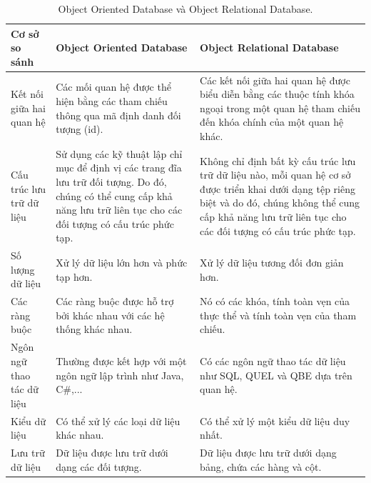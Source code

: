 \begin{table}[h]
    \centering
    \begin{tabular}{|m{3cm}|m{5cm}|m{5cm}|}
    \hline 
        \textbf{Cơ sở so sánh} & \textbf{Object Oriented Database} & \textbf{Object Relational Database}\\ \hline
        Kết nối giữa hai quan hệ 
        & Các mối quan hệ được thể hiện bằng các tham chiếu thông qua mã định danh đối tượng (id).
        & Các kết nối giữa hai quan hệ được biểu diễn bằng các thuộc tính khóa ngoại trong một quan hệ tham chiếu đến khóa chính của một quan hệ khác.\\ \hline
        Cấu trúc lưu trữ dữ liệu 
        & Sử dụng các kỹ thuật lập chỉ mục để định vị các trang đĩa lưu trữ đối tượng. Do đó, chúng có thể cung cấp khả năng lưu trữ liên tục cho các đối tượng có cấu trúc phức tạp. 
        & Không chỉ định bất kỳ cấu trúc lưu trữ dữ liệu nào, mỗi quan hệ cơ sở được triển khai dưới dạng tệp riêng biệt và do đó, chúng không thể cung cấp khả năng lưu trữ liên tục cho các đối tượng có cấu trúc phức tạp.\\ \hline
        Số lượng dữ liệu 
        & Xử lý dữ liệu lớn hơn và phức tạp hơn.
        & Xử lý dữ liệu tương đối đơn giản hơn.\\ \hline
        Các ràng buộc 
        & Các ràng buộc được hỗ trợ bởi khác nhau với các hệ thống khác nhau. 
        & Nó có các khóa, tính toàn vẹn của thực thể và tính toàn vẹn của tham chiếu.\\ \hline
        Ngôn ngữ thao tác dữ liệu 
        & Thường được kết hợp với một ngôn ngữ lập trình như Java, C\#,... 
        & Có các ngôn ngữ thao tác dữ liệu như SQL, QUEL và QBE dựa trên quan hệ.\\ \hline
        Kiểu dữ liệu 
        & Có thể xử lý các loại dữ liệu khác nhau.
        & Có thể xử lý một kiểu dữ liệu duy nhất.\\ \hline
        Lưu trữ dữ liệu 
        & Dữ liệu được lưu trữ dưới dạng các đối tượng.
        & Dữ liệu được lưu trữ dưới dạng bảng, chứa các hàng và cột.\\
    \hline 
    \end{tabular}
    \caption{Object Oriented Database và Object Relational Database.}
    \label{OOD and ORD}
\end{table}

